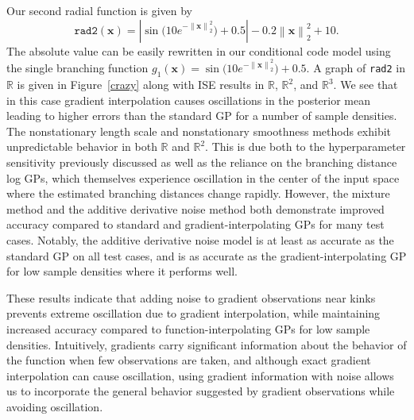 \documentclass{article}
\newcommand{\norm}[1]{\left\lVert#1\right\rVert}
\newcommand{\abs}[1]{\left|#1\right|}
\renewcommand{\vec}[1]{\mathbf{#1}}
\newcommand{\R}{\mathbb{R}}
\numberwithin{equation}{section}
\begin{document}
Our second radial function is given by
$$\texttt{rad2}(\vec{x}) = \abs{\sin\Big(10e^{-\norm{\vec{x}}_2^2}\Big) + 0.5} - 0.2\norm{\vec{x}}_2^2 + 10.$$
The absolute value can be easily rewritten in our conditional code model using the single branching function $g_1(\vec{x}) = \sin\Big(10e^{-\norm{\vec{x}}_2^2}\Big) + 0.5$. A graph of \texttt{rad2} in $\R$ is given in Figure~\ref{crazy} along with ISE results in $\R$, $\R^2$, and $\R^3$. We see that in this case gradient interpolation causes oscillations in the posterior mean leading to higher errors than the standard GP for a number of sample densities. The nonstationary length scale and nonstationary smoothness methods exhibit unpredictable behavior in both $\R$ and $\R^2$. This is due both to the hyperparameter sensitivity previously discussed as well as the reliance on the branching distance log GPs, which themselves experience oscillation in the center of the input space where the estimated branching distances change rapidly. However, the mixture method and the additive derivative noise method both demonstrate improved accuracy compared to standard and gradient-interpolating GPs for many test cases. Notably, the additive derivative noise model is at least as accurate as the standard GP on all test cases, and is as accurate as the gradient-interpolating GP for low sample densities where it performs well.

These results indicate that adding noise to gradient observations near kinks prevents extreme oscillation due to gradient interpolation, while maintaining increased accuracy compared to function-interpolating GPs for low sample densities. Intuitively, gradients carry significant information about the behavior of the function when few observations are taken, and although exact gradient interpolation can cause oscillation, using gradient information with noise allows us to incorporate the general behavior suggested by gradient observations while avoiding oscillation.
\end{document}
